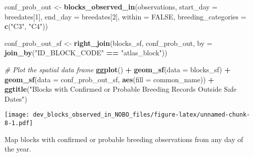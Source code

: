 \documentclass[
]{article}
\newenvironment{Shaded}{\begin{snugshade}}{\end{snugshade}}
\newcommand{\AttributeTok}[1]{\textcolor[rgb]{0.13,0.29,0.53}{#1}}
\newcommand{\CommentTok}[1]{\textcolor[rgb]{0.56,0.35,0.01}{\textit{#1}}}
\newcommand{\ConstantTok}[1]{\textcolor[rgb]{0.56,0.35,0.01}{#1}}
\newcommand{\DecValTok}[1]{\textcolor[rgb]{0.00,0.00,0.81}{#1}}
\newcommand{\FunctionTok}[1]{\textcolor[rgb]{0.13,0.29,0.53}{\textbf{#1}}}
\newcommand{\NormalTok}[1]{#1}
\newcommand{\OtherTok}[1]{\textcolor[rgb]{0.56,0.35,0.01}{#1}}
\newcommand{\SpecialCharTok}[1]{\textcolor[rgb]{0.81,0.36,0.00}{\textbf{#1}}}
\newcommand{\StringTok}[1]{\textcolor[rgb]{0.31,0.60,0.02}{#1}}
\begin{document}
\begin{Shaded}
\begin{Highlighting}[]
\NormalTok{conf\_prob\_out }\OtherTok{\textless{}{-}} \FunctionTok{blocks\_observed\_in}\NormalTok{(observations, }\AttributeTok{start\_day =}\NormalTok{ breedates[}\DecValTok{1}\NormalTok{], }
                                \AttributeTok{end\_day =}\NormalTok{ breedates[}\DecValTok{2}\NormalTok{], }
                                \AttributeTok{within =} \ConstantTok{FALSE}\NormalTok{,}
                                \AttributeTok{breeding\_categories =} \FunctionTok{c}\NormalTok{(}\StringTok{"C3"}\NormalTok{, }\StringTok{"C4"}\NormalTok{))}

\NormalTok{conf\_prob\_out\_sf }\OtherTok{\textless{}{-}} \FunctionTok{right\_join}\NormalTok{(blocks\_sf, conf\_prob\_out, }
                           \AttributeTok{by =} \FunctionTok{join\_by}\NormalTok{(}\StringTok{"ID\_BLOCK\_CODE"} \SpecialCharTok{==} \StringTok{"atlas\_block"}\NormalTok{))}

\CommentTok{\# Plot the spatial data frame}
\FunctionTok{ggplot}\NormalTok{() }\SpecialCharTok{+}
  \FunctionTok{geom\_sf}\NormalTok{(}\AttributeTok{data =}\NormalTok{ blocks\_sf) }\SpecialCharTok{+}
  \FunctionTok{geom\_sf}\NormalTok{(}\AttributeTok{data =}\NormalTok{ conf\_prob\_out\_sf, }\FunctionTok{aes}\NormalTok{(}\AttributeTok{fill =}\NormalTok{ common\_name)) }\SpecialCharTok{+}
  \FunctionTok{ggtitle}\NormalTok{(}\StringTok{"Blocks with Confirmed or Probable Breeding Records Outside Safe Dates"}\NormalTok{)}
\end{Highlighting}
\end{Shaded}

\texttt{[image: dev\_blocks\_observed\_in\_NOBO\_files/figure-latex/unnamed-chunk-8-1.pdf]}

Map blocks with confirmed or probable breeding observations from any day
of the year.
\end{document}
